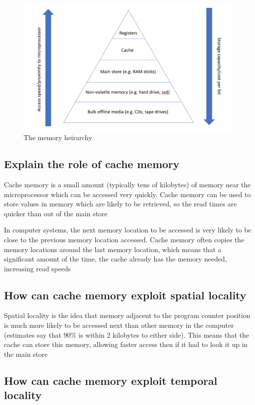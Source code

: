 \documentclass{article}
\begin{document}
\begin{figure}
\centering
\includegraphics[width=\textwidth]{./memoryHeirarchy.png}
\caption{The memory heirarchy}
\end{figure}


\subsection{Explain the role of cache memory}

Cache memory is a small amount (typically tens of kilobytes) of memory
near the microprocessor which can be accessed very quickly. Cache memory
can be used to store values in memory which are likely to be retrieved,
so the read times are quicker than out of the main store

In computer systems, the next memory location to be accessed is very
likely to be close to the previous memory location accessed. Cache
memory often copies the memory locations around the last memory
location, which means that a significant amount of the time, the cache
already has the memory needed, increasing read speeds


\subsection{How can cache memory exploit spatial locality}

Spatial locality is the idea that memory adjacent to the program counter
position is much more likely to be accessed next than other memory in
the computer (estimates say that 90\% is within 2 kilobytes to either
side). This means that the cache can store this memory, allowing faster
access then if it had to look it up in the main store


\subsection{How can cache memory exploit temporal locality}
\end{document}
